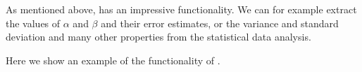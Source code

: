 \documentclass[letterpaper,10pt,english]{sphinxmanual}
\begin{document}
As mentioned above,  has an impressive functionality.
We can for example extract the values of \(\alpha\) and \(\beta\) and
their error estimates, or the variance and standard deviation and many
other properties from the statistical data analysis.

Here we show an
example of the functionality of .

\begin{sphinxVerbatim}[commandchars=\\\{\}]
    
    
    
      


\end{sphinxVerbatim}
\end{document}
